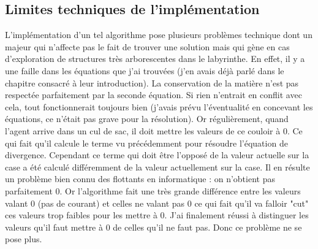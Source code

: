 \documentclass[10pt]{article}
\begin{document}
\subsection{Limites techniques de l'implémentation}
L'implémentation d'un tel algorithme pose plusieurs problèmes technique dont un majeur qui n'affecte pas le fait de trouver une solution mais qui gène en cas d'exploration de structures très arborescentes dans le labyrinthe. En effet, il y a une faille dans les équations que j'ai trouvées (j'en avais déjà parlé dans le chapitre consacré à leur introduction). La conservation de la matière n'est pas respectée parfaitement par la seconde équation. Si rien n'entrait en conflit avec cela, tout fonctionnerait toujours bien (j'avais prévu l'éventualité en concevant les équations, ce n'était pas grave pour la résolution). Or régulièrement, quand l'agent arrive dans un cul de sac, il doit mettre les valeurs de ce couloir à 0. Ce qui fait qu'il calcule le terme vu précédemment pour résoudre l'équation de divergence. Cependant ce terme qui doit être l'opposé de la valeur actuelle sur la case a été calculé différemment de la valeur actuellement sur la case. Il en résulte un problème bien connu des flottants en informatique : on n'obtient pas parfaitement 0. Or l'algorithme fait une très grande différence entre les valeurs valant 0 (pas de courant) et celles ne valant pas 0 ce qui fait qu'il va falloir "cut" ces valeurs trop faibles pour les mettre à 0. J'ai finalement réussi à distinguer les valeurs qu'il faut mettre à 0 de celles qu'il ne faut pas. Donc ce problème ne se pose plus.
\end{document}
